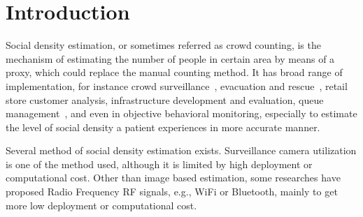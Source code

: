 \chapter{Introduction}\label{ch:introduction}




Social density estimation, or sometimes referred as crowd counting, is the mechanism of estimating the number of people in certain area by means of a proxy, which could replace the manual counting method. It has broad range of implementation, for instance crowd surveillance~\cite{thesis050}, evacuation and rescue~\cite{thesis045}, retail store customer analysis, infrastructure development and evaluation, queue management~\cite{thesis012}, and even in objective behavioral monitoring, especially to estimate the level of social density a patient experiences in more accurate manner.

Several method of social density estimation exists. Surveillance camera utilization is one of the method used, although it is limited by high deployment or computational cost. Other than image based estimation, some researches have proposed Radio Frequency RF signals, e.g., WiFi or Bluetooth, mainly to get more low deployment or computational cost.

